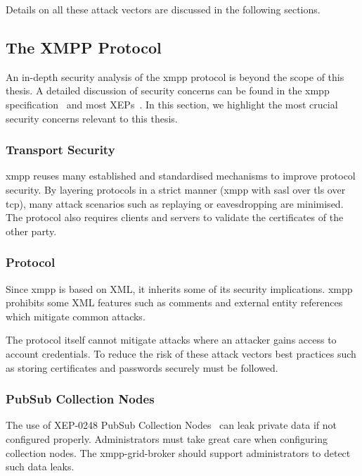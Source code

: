 Details on all these attack vectors are discussed in the following sections.

\subsection{The XMPP Protocol}

An in-depth security analysis of the \gls{xmpp} protocol is beyond the scope of this thesis.
A detailed discussion of security concerns can be found in the \gls{xmpp} specification~\cite{rfc6120} and most XEPs~\cite{xep-0060}\cite{xep-0248}.
In this section, we highlight the most crucial security concerns relevant to this thesis.

\subsubsection{Transport Security}

\gls{xmpp} reuses many established and standardised mechanisms to improve protocol security.
By layering protocols in a strict manner (\gls{xmpp} with \gls{sasl} over \gls{tls} over \gls{tcp}), many attack scenarios such as replaying or eavesdropping are minimised.
The protocol also requires clients and servers to validate the certificates of the other party.~\cite{rfc7590}\cite{rfc6120}

\subsubsection{Protocol}

Since \gls{xmpp} is based on XML, it inherits some of its security implications.
\gls{xmpp} prohibits some XML features such as comments and external entity references which mitigate common attacks.~\cite{rfc6120}

The protocol itself cannot mitigate attacks where an attacker gains access to account credentials.
To reduce the risk of these attack vectors best practices such as storing certificates and passwords securely must be followed.

\subsubsection{PubSub Collection Nodes}

The use of XEP-0248 PubSub Collection Nodes~\cite{xep-0248} can leak private data if not configured properly.
Administrators must take great care when configuring collection nodes.
The \gls{xmpp-grid-broker} should support administrators to detect such data leaks.

